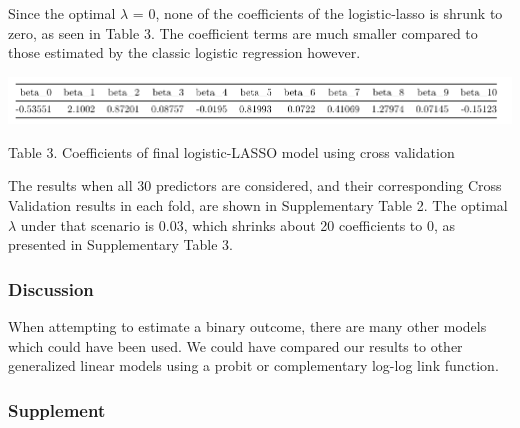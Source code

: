 \documentclass[]{article}
\begin{document}
Since the optimal \(\lambda\) = 0, none of the coefficients of the
logistic-lasso is shrunk to zero, as seen in Table 3. The coefficient
terms are much smaller compared to those estimated by the classic
logistic regression however.

\begin{center}
\includegraphics{./results/10 coed when lambd=0.png}
\end{center}

\begin{center}
Table 3. Coefficients of final logistic-LASSO model using cross validation
\end{center}

The results when all 30 predictors are considered, and their
corresponding Cross Validation results in each fold, are shown in
Supplementary Table 2. The optimal \(\lambda\) under that scenario is
0.03, which shrinks about 20 coefficients to 0, as presented in
Supplementary Table 3.

\hypertarget{discussion}{%
\subsubsection{Discussion}\label{discussion}}

When attempting to estimate a binary outcome, there are many other
models which could have been used. We could have compared our results to
other generalized linear models using a probit or complementary log-log
link function.

\hypertarget{supplement}{%
\subsubsection{Supplement}\label{supplement}}
\end{document}
